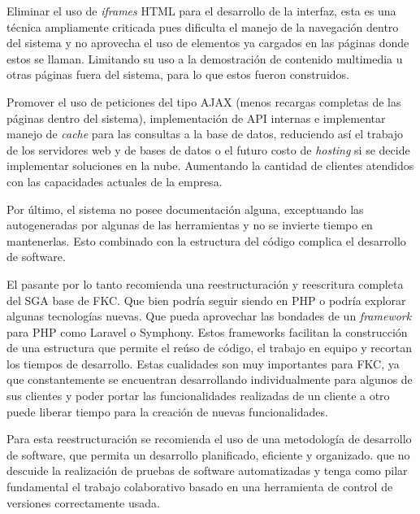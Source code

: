 Eliminar el uso de \emph{iframes} \gls{HTML} para el desarrollo de la interfaz, esta es una técnica ampliamente criticada pues dificulta el manejo de la navegación dentro del sistema y no aprovecha el uso de elementos ya cargados en las páginas donde estos se llaman. Limitando su uso a la demostración de contenido multimedia u otras páginas fuera del sistema, para lo que estos fueron construidos.

Promover el uso de peticiones del tipo \gls{AJAX} (menos recargas completas de las páginas dentro del sistema), implementación de \gls{API} internas e implementar manejo de \emph{cache} para las consultas a la base de datos, reduciendo así el trabajo de los servidores web y de bases de datos o el futuro costo de \emph{hosting} si se decide implementar soluciones en la nube. Aumentando la cantidad de clientes atendidos con las capacidades actuales de la empresa.

Por último, el sistema no posee documentación alguna, exceptuando las autogeneradas por algunas de las herramientas y no se invierte tiempo en mantenerlas. Esto combinado con la estructura del código complica el desarrollo de software.

El pasante por lo tanto recomienda una reestructuración y reescritura completa del \gls{SGA} base de FKC. Que bien podría seguir siendo en PHP o podría explorar algunas tecnologías nuevas. Que pueda aprovechar las bondades de un \emph{framework} para PHP como Laravel o Symphony. Estos frameworks facilitan la construcción de una estructura que permite el reúso de código, el trabajo en equipo y recortan los tiempos de desarrollo. Estas cualidades son muy importantes para FKC, ya que constantemente se encuentran desarrollando individualmente para algunos de sus clientes y poder portar las funcionalidades realizadas de un cliente a otro puede liberar tiempo para la creación de nuevas funcionalidades.

Para esta reestructuración se recomienda el uso de una metodología de desarrollo de software, que permita un desarrollo planificado, eficiente y organizado. que no descuide la realización de pruebas de software automatizadas y tenga como pilar fundamental el trabajo colaborativo basado en una herramienta de control de versiones correctamente usada.


